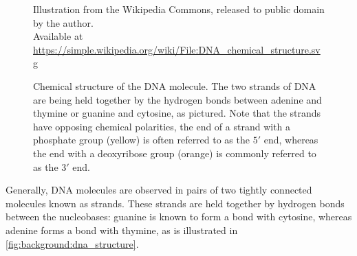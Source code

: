 \documentclass[parskip]{cs4rep}
\begin{document}
\begin{figure}[p]
    \centering
                 {Illustration from the Wikipedia Commons, released to public domain by the author.\\
                  Available at \url{https://simple.wikipedia.org/wiki/File:DNA_chemical_structure.svg}}
    \caption{Chemical structure of the DNA molecule. The two strands of DNA are being held together by the hydrogen bonds between adenine and thymine or guanine and cytosine, as pictured. Note that the strands have opposing chemical polarities, the end of a strand with a phosphate group (yellow) is often referred to as the $5'$ end, whereas the end with a deoxyribose group (orange) is commonly referred to as the $3'$ end.}
    \label{fig:background:dna_structure}
\end{figure}

Generally, DNA molecules are observed in pairs of two tightly connected molecules known as strands. These strands are held together by hydrogen bonds between the nucleobases: guanine is
known to form a bond with cytosine, whereas adenine forms a bond with thymine, as is illustrated in \autoref{fig:background:dna_structure}.
\end{document}
